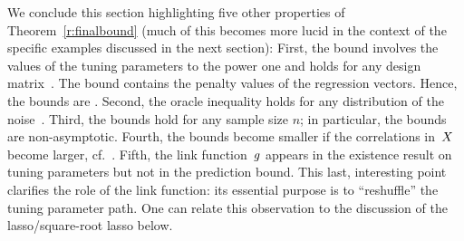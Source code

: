 \documentclass[bj]{imsart}
\newcommand{\1}{{\rm 1}\mskip -4,5mu{\rm l} }
\begin{document}
We conclude this section highlighting five other properties of Theorem~\ref{r:finalbound} (much of this becomes more lucid in the context of the specific examples discussed in the next section): First, the bound involves the values of the tuning parameters to the power one and holds for any design matrix~\design. The bound contains the penalty values of the regression vectors. Hence, the bounds are \pbos. Second, the oracle inequality holds for any distribution of the noise~\noise. Third, the bounds hold for any sample size $n$; in particular, the bounds are non-asymptotic. Fourth, the bounds become smaller if the correlations in~$\textcolor{black}{X}$ become larger, cf.~\cite{Hebiri13}. Fifth, the link function~$g$ appears in the existence result on tuning parameters but not in the prediction bound. This last, interesting point clarifies the role of the link function: its essential purpose is to ``reshuffle'' the tuning parameter path. One can relate this observation to the discussion of the lasso/square-root lasso below.
\end{document}
